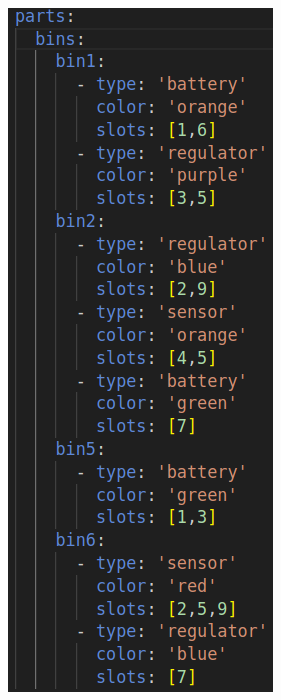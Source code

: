 \documentclass{uva-inf-article}
\begin{document}
\begin{figure}[h]
\centering
\includegraphics[scale=0.385]{images/rwa67_trial_1.png}

\end{figure}
\end{document}
